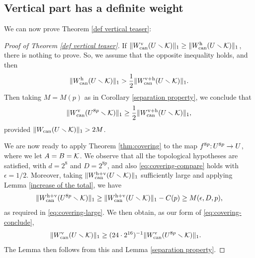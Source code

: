 \subsection{Vertical part has a definite weight} \label{covering-application}
We can now prove Theorem \ref{def vertical teaser}:
\begin{proof}[Proof of Theorem \ref{def vertical teaser}]
   If $\| W_{\mathrm{can}}^{\mathrm{v}} (U\smallsetminus {\mathcal K})\|_1 \geq \| W_{\mathrm{can}}^{\mathrm{h}} (U\smallsetminus {\mathcal K})\|_1 $,
there is nothing to prove. So, we assume that the opposite inequality holds,
and then
$$
   \| W_{\mathrm{can}}^{\mathrm{h}} (U\smallsetminus {\mathcal K})\|_1 > \frac{1}{2} \| W_{\mathrm{can}}^{{\mathrm{v}}+{\mathrm{h}}} (U\smallsetminus {\mathcal K})\|_1.
$$
Then taking $M=M(p)$ as in Corollary \ref{separation property},
we conclude that
\begin{equation}\label{separation for f^n}
     \| W^{\mathrm{v}}_{\mathrm{can}}(U^{8p}\smallsetminus {\mathcal K})\|_1 \geq  \frac{1}{2}  \| W_{\mathrm{can}}^{{\mathrm{v}}+{\mathrm{h}}}(U \smallsetminus {\mathcal K}) \|_1 ,
\end{equation}
provided  $\| W_{\mathrm{can}} (U\smallsetminus {\mathcal K})\|_1>2M$.

We are now ready to apply Theorem \ref{thm:covering} 
to the map $f^{8p}\mathpunct: U^{8p} \to U$,
where we let $A = B = {\mathcal K}$.
We observe that all the topological hypotheses are satisfied, 
with $d = 2^{8}$ and $D = 2^{8p}$, 
and also \eqref{eq:covering-compare} holds with $\epsilon = 1/2$.
Moreover,
taking $\Vert W_{\operatorname{can}}^{{\mathrm{h}}+{\mathrm{v}}}(U \smallsetminus {\mathcal K}) \Vert_1$ sufficiently large and applying Lemma \ref{increase of the total},
we have 
$$
\Vert W_{\operatorname{can}}^{{\mathrm{h}}+{\mathrm{v}}}(U^{8p} \smallsetminus {\mathcal K}) \Vert_1 \ge \Vert W_{\operatorname{can}}^{{\mathrm{h}}+{\mathrm{v}}}(U \smallsetminus {\mathcal K}) \Vert_1 - C(p) \ge M(\epsilon, D, p),
$$
as required in \eqref{eq:covering-large}.
We then obtain,
as our form of \eqref{eq:covering-conclude},
\begin{align*}
\Vert W_{\operatorname{can}}^{{\mathrm{v}}}(U \smallsetminus {\mathcal K}) \Vert_1 &\ge (24 \cdot 2^{16})^{-1} \Vert W_{\operatorname{can}}^{{\mathrm{v}}}(U^{8p} \smallsetminus {\mathcal K}) \Vert_1.
\end{align*}
The Lemma then follows from this and Lemma \ref{separation property}.
\end{proof}




